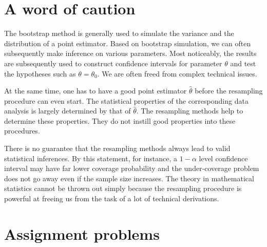 \section{A word of caution}

The bootstrap method is generally used to simulate the variance
and the distribution of a point estimator. Based on bootstrap simulation,
we can often subsequently make inference on various parameters.
Most noticeably, the results are subsequently used to
construct confidence intervals for parameter
$\theta$ and test the hypotheses such as $\theta = \theta_0$.
We are often freed from complex technical issues.

At the same time, one has to have a good point estimator $\hat \theta$ before
the resampling procedure can even start. The statistical properties of the
corresponding data analysis is largely determined by that of $\hat \theta$.
The resampling methods help to determine these properties.
They do not instill good properties into these procedures.

There is no guarantee that the resampling methods always lead
to valid statistical inferences. By this statement, for instance, a
$1-\alpha$ level confidence interval may have far lower coverage
probability and the under-coverage problem does not go away
even if the sample size increases. The theory in mathematical
statistics cannot be thrown out simply because the resampling
procedure is powerful at freeing us from the task of a lot of
technical derivations.


\section{Assignment problems}


